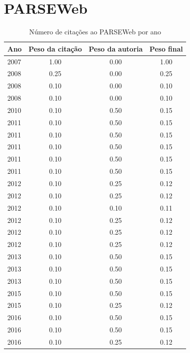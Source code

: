 \section{PARSEWeb}
\begin{table}[H]
\caption{Número de citações ao PARSEWeb por ano}
\centering
\begin{tabular}{| l | c | c | c |}
  \hline
  Ano & Peso da citação & Peso da autoria & Peso final \\
  \hline
  2007
    & 1.00
    & 0.00
    & {\color{blue} 1.00} \\
\hline
  2008
    & 0.25
    & 0.00
    & {\color{red} 0.25} \\
  2008
    & 0.10
    & 0.00
    & {\color{red} 0.10} \\
  2008
    & 0.10
    & 0.00
    & {\color{red} 0.10} \\
\hline
  2010
    & 0.10
    & 0.50
    & {\color{red} 0.15} \\
\hline
  2011
    & 0.10
    & 0.50
    & {\color{red} 0.15} \\
  2011
    & 0.10
    & 0.50
    & {\color{red} 0.15} \\
  2011
    & 0.10
    & 0.50
    & {\color{red} 0.15} \\
  2011
    & 0.10
    & 0.50
    & {\color{red} 0.15} \\
  2011
    & 0.10
    & 0.50
    & {\color{red} 0.15} \\
\hline
  2012
    & 0.10
    & 0.25
    & {\color{red} 0.12} \\
  2012
    & 0.10
    & 0.25
    & {\color{red} 0.12} \\
  2012
    & 0.10
    & 0.10
    & {\color{red} 0.11} \\
  2012
    & 0.10
    & 0.25
    & {\color{red} 0.12} \\
  2012
    & 0.10
    & 0.25
    & {\color{red} 0.12} \\
  2012
    & 0.10
    & 0.25
    & {\color{red} 0.12} \\
\hline
  2013
    & 0.10
    & 0.50
    & {\color{red} 0.15} \\
  2013
    & 0.10
    & 0.50
    & {\color{red} 0.15} \\
  2013
    & 0.10
    & 0.50
    & {\color{red} 0.15} \\
\hline
  2015
    & 0.10
    & 0.50
    & {\color{red} 0.15} \\
  2015
    & 0.10
    & 0.25
    & {\color{red} 0.12} \\
\hline
  2016
    & 0.10
    & 0.50
    & {\color{red} 0.15} \\
  2016
    & 0.10
    & 0.50
    & {\color{red} 0.15} \\
  2016
    & 0.10
    & 0.25
    & {\color{red} 0.12} \\
\hline
\end{tabular}
\end{table}
